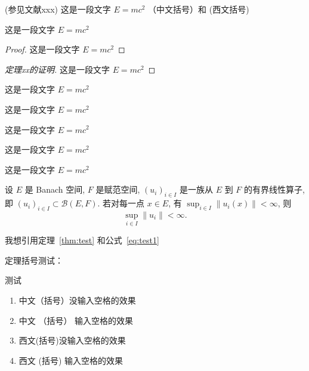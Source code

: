 \begin{defi}[测度]
    (参见文献xxx) 这是一段文字 $E = m c^2$  （中文括号）和 (西文括号)
\end{defi}

\begin{theo}
    这是一段文字 $E = m c^2$
\end{theo}

\begin{proof}
    这是一段文字 $E = m c^2$
\end{proof}

\begin{proof}[定理xx的证明]
    这是一段文字 $E = m c^2$
\end{proof}

\begin{exam}
    这是一段文字 $E = m c^2$
\end{exam}

\begin{prop}
    这是一段文字 $E = m c^2$
\end{prop}

\begin{coro}
    这是一段文字 $E = m c^2$
\end{coro}

\begin{lemm}
    这是一段文字 $E = m c^2$
\end{lemm}

\begin{rema}
    这是一段文字 $E = m c^2$
\end{rema}

\begin{theo}\label{thm:test}
    设 $E$ 是 Banach 空间, $F$ 是赋范空间, $(u_i)_{i\in I}$ 是一族从 $E$ 到 $F$ 的有界线性算子,
    即 $(u_i)_{i\in I}\subset \mathcal{B}(E,F)$. 若对每一点 $x\in E$, 有
    $\sup_{i\in I} \|u_i(x)\|<\infty$, 则
    \begin{equation}\label{eq:test1}
        \sup_{i\in I} \|u_i\| < \infty.
    \end{equation}
\end{theo}

我想引用定理~\ref{thm:test} 和公式~\ref{eq:test1}

定理括号测试：

\begin{theo}
    测试
    \begin{enumerate}
        \item 中文（括号）没输入空格的效果
        \item 中文 （括号） 输入空格的效果
        \item 西文(括号)没输入空格的效果
        \item 西文 (括号) 输入空格的效果
    \end{enumerate}
\end{theo}

